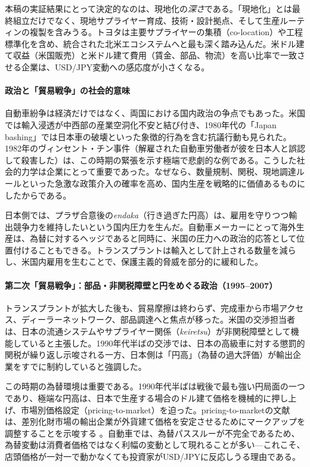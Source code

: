 \documentclass[12pt,a4paper]{article}
\begin{document}
本稿の実証結果にとって決定的なのは、現地化の\emph{深さ}である。「現地化」とは最終組立だけでなく、現地サプライヤー育成、技術・設計拠点、そして生産ルーティンの複製を含みうる。トヨタは主要サプライヤーの集積（co-location）や工程標準化を含め、統合された北米エコシステムへと最も深く踏み込んだ。米ドル建て収益（米国販売）と米ドル建て費用（賃金、部品、物流）を高い比率で一致させる企業は、USD/JPY変動への感応度が小さくなる。

\paragraph{政治と「貿易戦争」の社会的意味}

自動車紛争は経済だけではなく、両国における国内政治の争点でもあった。米国では輸入浸透が中西部の産業空洞化不安と結び付き、1980年代の「Japan bashing」では日本車の破壊といった象徴的行為を含む抗議行動も見られた。1982年のヴィンセント・チン事件（解雇された自動車労働者が彼を日本人と誤認して殺害した）は、この時期の緊張を示す極端で悲劇的な例である。こうした社会的力学は企業にとって重要であった。なぜなら、数量規制、関税、現地調達ルールといった急激な政策介入の確率を高め、国内生産を戦略的に価値あるものにしたからである。

日本側では、プラザ合意後の\textit{endaka}（行き過ぎた円高）は、雇用を守りつつ輸出競争力を維持したいという国内圧力を生んだ。自動車メーカーにとって海外生産は、為替に対するヘッジであると同時に、米国の圧力への政治的応答として位置付けることもできる。トランスプラントは輸入として計上される数量を減らし、米国内雇用を生むことで、保護主義的脅威を部分的に緩和した。

\paragraph{第二次「貿易戦争」：部品・非関税障壁と円をめぐる政治（1995--2007）}

トランスプラントが拡大した後も、貿易摩擦は終わらず、完成車から市場アクセス、ディーラーネットワーク、部品調達へと焦点が移った。米国の交渉担当者は、日本の流通システムやサプライヤー関係（\textit{keiretsu}）が非関税障壁として機能していると主張した。1990年代半ばの交渉では、日本の高級車に対する懲罰的関税が繰り返し示唆される一方、日本側は「円高」（為替の過大評価）が輸出企業をすでに制約していると強調した。

この時期の為替環境は重要である。1990年代半ばは戦後で最も強い円局面の一つであり、極端な円高は、日本で生産する場合のドル建て価格を機械的に押し上げ、市場別価格設定（pricing-to-market）を迫った。pricing-to-marketの文献は、差別化財市場の輸出企業が外貨建て価格を安定させるためにマークアップを調整することを示唆する \citep{krugman1987,knetter1993}。自動車では、為替パススルーが不完全であるため、為替変動は消費者価格ではなく利幅の変動として現れることが多い---これこそ、店頭価格が一対一で動かなくても投資家がUSD/JPYに反応しうる理由である。
\end{document}
